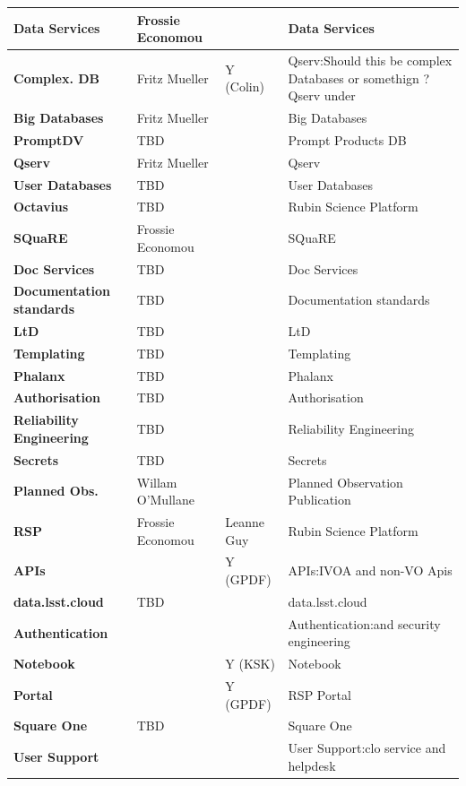 \begin{longtable} {
|p{}   |p{}|p{} |p{}|}
{\textbf{Data Services}} & Frossie Economou &  & Data Services \\ \hline
{\textbf{Complex. DB}} & Fritz Mueller & Y (Colin) & Qserv:Should this be complex Databases or somethign ? Qserv under \\ \hline
{\textbf{Big Databases}} & Fritz Mueller &  & Big Databases \\ \hline
{\textbf{PromptDV}} & TBD &  & Prompt Products DB \\ \hline
{\textbf{Qserv}} & Fritz Mueller &  & Qserv \\ \hline
{\textbf{User Databases}} & TBD &  & User Databases \\ \hline
{\textbf{Octavius}} & TBD &  & Rubin Science Platform \\ \hline
{\textbf{SQuaRE}} & Frossie Economou &  & SQuaRE \\ \hline
{\textbf{Doc Services}} & TBD &  & Doc Services \\ \hline
{\textbf{Documentation standards}} & TBD &  & Documentation standards \\ \hline
{\textbf{LtD}} & TBD &  & LtD \\ \hline
{\textbf{Templating}} & TBD &  & Templating \\ \hline
{\textbf{Phalanx}} & TBD &  & Phalanx \\ \hline
{\textbf{Authorisation}} & TBD &  & Authorisation \\ \hline
{\textbf{Reliability Engineering}} & TBD &  & Reliability Engineering \\ \hline
{\textbf{Secrets}} & TBD &  & Secrets \\ \hline
{\textbf{Planned Obs.}} & Willam O'Mullane &  & Planned Observation Publication \\ \hline
{\textbf{RSP}} & Frossie Economou & Leanne Guy & Rubin Science Platform \\ \hline
{\textbf{APIs}} &  & Y (GPDF) & APIs:IVOA and non-VO Apis \\ \hline
{\textbf{data.lsst.cloud}} & TBD &  & data.lsst.cloud \\ \hline
{\textbf{Authentication}} &  &  & Authentication:and security engineering \\ \hline
{\textbf{Notebook}} &  & Y (KSK) & Notebook \\ \hline
{\textbf{Portal}} &  & Y (GPDF) & RSP Portal \\ \hline
{\textbf{Square One}} & TBD &  & Square One \\ \hline
{\textbf{User Support}} &  &  & User Support:clo service and helpdesk \\ \hline

\end{longtable}
